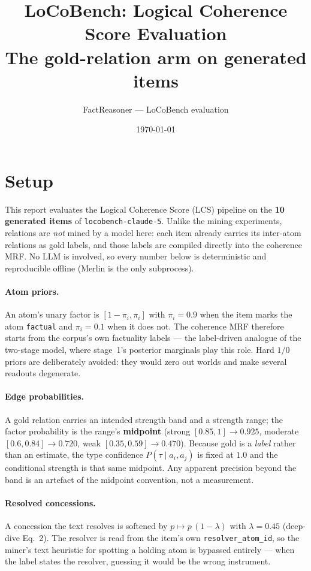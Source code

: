 \documentclass[11pt]{article}
\title{LoCoBench: Logical Coherence Score Evaluation\\
\large The gold-relation arm on generated items}
\author{FactReasoner --- LoCoBench evaluation}
\date{\today}
\begin{document}
\maketitle

\section{Setup}

This report evaluates the Logical Coherence Score (LCS) pipeline on the \textbf{10 generated items} of \texttt{locobench-claude-5}. Unlike the mining experiments, relations are \emph{not} mined by a model here: each item already carries its inter-atom relations as gold labels, and those labels are compiled directly into the coherence MRF. No LLM is involved, so every number below is deterministic and reproducible offline (Merlin is the only subprocess).

\paragraph{Atom priors.} An atom's unary factor is $[1-\pi_i, \pi_i]$ with $\pi_i = 0.9$ when the item marks the atom \texttt{factual} and $\pi_i = 0.1$ when it does not. The coherence MRF therefore starts from the corpus's own factuality labels --- the label-driven analogue of the two-stage model, where stage~1's posterior marginals play this role. Hard $1/0$ priors are deliberately avoided: they would zero out worlds and make several readouts degenerate.

\paragraph{Edge probabilities.} A gold relation carries an intended strength band and a strength range; the factor probability is the range's \textbf{midpoint} (strong $[0.85,1] \to 0.925$, moderate $[0.6,0.84] \to 0.720$, weak $[0.35,0.59] \to 0.470$). Because gold is a \emph{label} rather than an estimate, the type confidence $P(\tau \mid a_i,a_j)$ is fixed at $1.0$ and the conditional strength is that same midpoint. Any apparent precision beyond the band is an artefact of the midpoint convention, not a measurement.

\paragraph{Resolved concessions.} A concession the text resolves is softened by $p \mapsto p\,(1-\lambda)$ with $\lambda = 0.45$ (deep-dive Eq.~2). The resolver is read from the item's own \texttt{resolver\_atom\_id}, so the miner's text heuristic for spotting a holding atom is bypassed entirely --- when the label states the resolver, guessing it would be the wrong instrument.
\end{document}
